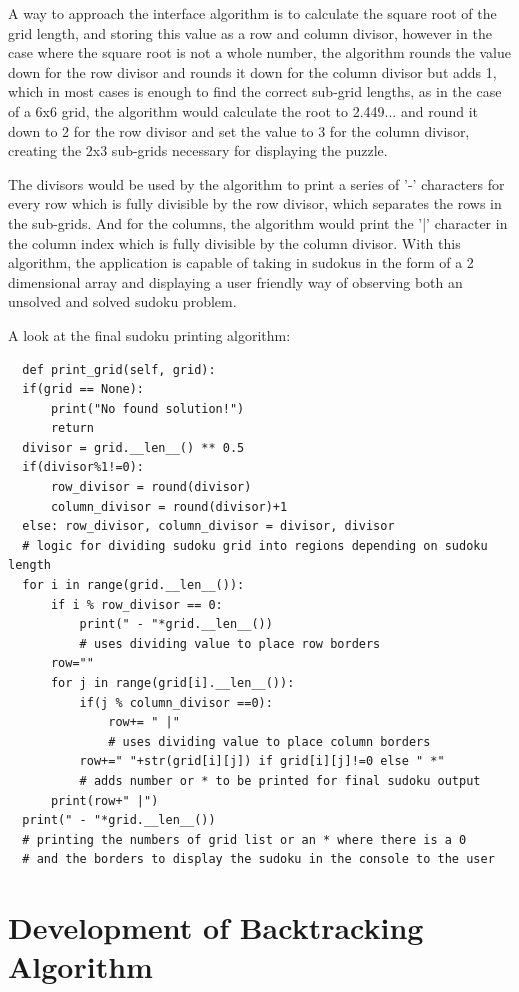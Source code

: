 \documentclass[]{final_report}
\begin{document}
A way to approach the interface algorithm is to calculate the square root of the grid length, and storing this value as a row and column divisor, however in the case where the square root is not a whole number, the algorithm rounds the value down for the row divisor and rounds it down for the column divisor but adds 1, which in most cases is enough to find the correct sub-grid lengths, as in the case of a 6x6 grid, the algorithm would calculate the root to 2.449... and round it down to 2 for the row divisor and set the value to 3 for the column divisor, creating the 2x3 sub-grids necessary for displaying the puzzle. 

The divisors would be used by the algorithm to print a series of '-' characters for every row which is fully divisible by the row divisor, which separates the rows in the sub-grids. And for the columns, the algorithm would print the '|' character in the column index which is fully divisible by the column divisor. With this algorithm, the application is capable of taking in sudokus in the form of a 2 dimensional array and displaying a user friendly way of observing both an unsolved and solved sudoku problem. 

A look at the final sudoku printing algorithm:
\begin{verbatim}
  def print_grid(self, grid):
  if(grid == None):
      print("No found solution!")
      return
  divisor = grid.__len__() ** 0.5
  if(divisor%1!=0):
      row_divisor = round(divisor)
      column_divisor = round(divisor)+1
  else: row_divisor, column_divisor = divisor, divisor
  # logic for dividing sudoku grid into regions depending on sudoku length
  for i in range(grid.__len__()):
      if i % row_divisor == 0:
          print(" - "*grid.__len__())
          # uses dividing value to place row borders
      row=""
      for j in range(grid[i].__len__()):
          if(j % column_divisor ==0):
              row+= " |"
              # uses dividing value to place column borders
          row+=" "+str(grid[i][j]) if grid[i][j]!=0 else " *"
          # adds number or * to be printed for final sudoku output
      print(row+" |")
  print(" - "*grid.__len__())
  # printing the numbers of grid list or an * where there is a 0
  # and the borders to display the sudoku in the console to the user
\end{verbatim}

\section{Development of Backtracking Algorithm}
\end{document}

